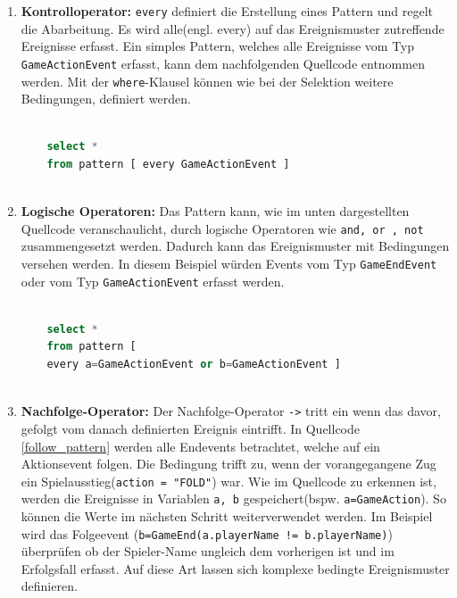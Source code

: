 \begin{enumerate}
	\item \textbf{Kontrolloperator:} \texttt{every} definiert die Erstellung eines Pattern und regelt die Abarbeitung. Es wird alle(engl. every) auf das Ereignismuster zutreffende Ereignisse erfasst. Ein simples Pattern, welches alle Ereignisse vom Typ \texttt{GameActionEvent} erfasst, kann dem nachfolgenden Quellcode entnommen werden.
	Mit der \texttt{where}-Klausel können wie bei der Selektion weitere Bedingungen, definiert werden.
	
	\begin{lstlisting}[caption={Einfaches Pattern mit Where-Klausel},label=basic_pattern, captionpos=b,language=SQL]

	select *
	from pattern [ every GameActionEvent ]
	
	\end{lstlisting}
	
	\item \textbf{Logische Operatoren:} 
	Das Pattern kann, wie im unten dargestellten Quellcode veranschaulicht, durch logische Operatoren wie \texttt{and, or , not} zusammengesetzt werden. Dadurch kann das Ereignismuster mit Bedingungen versehen werden. In diesem Beispiel würden Events vom Typ \texttt{GameEndEvent} oder vom Typ \texttt{GameActionEvent} erfasst werden.
	
	\begin{lstlisting}[caption={Pattern mit logischen Operatoren},label=logic_pattern,captionpos=b,language=SQL]
	
	select *
	from pattern [
	every a=GameActionEvent or b=GameActionEvent ]
	
	\end{lstlisting}
	
	\item \textbf{Nachfolge-Operator:}
	Der Nachfolge-Operator \texttt{->} tritt ein wenn das davor, gefolgt vom danach definierten Ereignis eintrifft. In Quellcode \ref{follow_pattern}  werden alle Endevents betrachtet, welche auf ein Aktionsevent folgen. Die Bedingung trifft zu, wenn der vorangegangene Zug ein Spielausstieg(\texttt{action = "FOLD"}) war.
	Wie im Quellcode zu erkennen ist, werden die Ereignisse in Variablen \texttt{a, b} gespeichert(bspw. \texttt{a=GameAction}). So können die Werte im nächsten Schritt weiterverwendet werden. Im Beispiel wird das Folgeevent (\texttt{b=GameEnd(a.playerName != b.playerName)}) überprüfen ob der Spieler-Name ungleich dem vorherigen ist und im Erfolgsfall erfasst. Auf diese Art lassen sich komplexe bedingte Ereignismuster definieren.
	

\end{enumerate}
